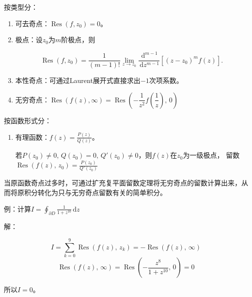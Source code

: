 \documentclass[UTF8,fontset=fandol,zihao=5]{ctexart}
\newcommand{\dd}{\,\mathrm{d}}
\newcommand{\Res}{\operatorname{Res}}
\begin{document}
\begin{methodbox}[【技巧】计算留数]
  按类型分：
  
  \begin{enumerate}
    \item 可去奇点：$\Res(f,z_0)=0$。
    
    \item 极点：设$z_0$为$m$阶极点，则
    
    \[
      \Res(f,z_0)=\frac{1}{(m-1)!}\lim_{z\to z_0}\frac{\dd^{m-1}}{\dd z^{m-1}}\left[(z-z_0)^mf(z)\right].
    \]
    
    \item 本性奇点：可通过Laurent展开式直接求出$-1$次项系数。
    
    \item 无穷奇点：$\Res (f(z),\infty)=\Res\left(-\dfrac{1}{z^2}f\left(\dfrac{1}{z}\right),\,0\right)$
  \end{enumerate}

  按函数形式分：
  \begin{enumerate}
    \item 有理函数：$\displaystyle f(z)=\frac{P(z)}{Q(z)}$。
    
    若$P(z_0)\ne0,\,Q(z_0)=0,\,Q'(z_0)\ne0$，则$f(z)$在$z_0$为一级极点，
    留数$\displaystyle\Res(f(z),\,z_0)=\frac{P(z_0)}{Q'(z_0)}$

  \end{enumerate}

\end{methodbox}

\begin{methodbox}[【技巧】用扩充复平面留数定理计算多奇点定积分]
  当原函数奇点过多时，可通过扩充复平面留数定理将无穷奇点的留数计算出来，从而将原积分转化为只与无穷奇点留数有关的简单积分。

  例：计算$\displaystyle I=\oint_{\partial D}\frac{1}{1+z^{10}}\dd z$

  解：
  
  \[
  I=\sum_{k=0}^{9}\Res(f(z),\,z_k)=-\Res(f(z),\,\infty)
  \]
  \[
  \Res(f(z),\,\infty)=\Res\left(-\dfrac{z^8}{1+z^{10}},\,0\right)=0
  \]

  所以$I=0$。
\end{methodbox}
\end{document}
